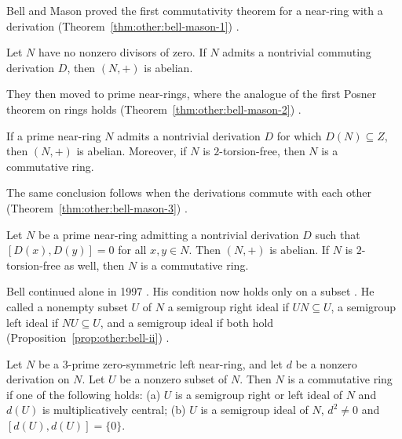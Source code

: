 Bell and Mason proved the first commutativity theorem for a near-ring with a
derivation (Theorem~\ref{thm:other:bell-mason-1}) \cite[Theorem~1,
p.~32]{BellMason1987}.

\begin{theorem}\label{thm:other:bell-mason-1}
Let $N$ have no nonzero divisors of zero. If $N$ admits a nontrivial
commuting derivation $D$, then $(N, +)$ is abelian.
\end{theorem}

They then moved to prime near-rings, where the analogue of the first Posner
theorem on rings holds (Theorem~\ref{thm:other:bell-mason-2}) \cite[Theorem~2,
p.~32]{BellMason1987}.

\begin{theorem}\label{thm:other:bell-mason-2}
If a prime near-ring $N$ admits a nontrivial derivation $D$ for which
$D(N) \subseteq Z$, then $(N, +)$ is abelian. Moreover, if $N$ is
$2$-torsion-free, then $N$ is a commutative ring.
\end{theorem}

The same conclusion follows when the derivations commute with each other (Theorem~\ref{thm:other:bell-mason-3})
\cite[Theorem~3, p.~33]{BellMason1987}.\begin{theorem}\label{thm:other:bell-mason-3}
Let $N$ be a prime near-ring admitting a nontrivial derivation $D$ such
that $[D(x), D(y)] = 0$ for all $x, y \in N$. Then $(N, +)$ is abelian.
If $N$ is $2$-torsion-free as well, then $N$ is a commutative ring.
\end{theorem}

Bell continued alone in 1997 \cite[p.~191]{Bell1997II}. His condition now
holds only on a subset \cite[p.~191]{Bell1997II}. He called a nonempty subset
$U$ of $N$ a semigroup right ideal if $U N \subseteq U$, a semigroup left
ideal if $N U \subseteq U$, and a semigroup ideal if both hold
(Proposition~\ref{prop:other:bell-ii}) \cite[p.~191]{Bell1997II}.

\begin{proposition}\label{prop:other:bell-ii}
Let $N$ be a $3$-prime zero-symmetric left near-ring, and let $d$ be a
nonzero derivation on $N$. Let $U$ be a nonzero subset of $N$. Then $N$ is
a commutative ring if one of the following holds: \textup{(a)} $U$ is a
semigroup right or left ideal of $N$ and $d(U)$ is multiplicatively
central; \textup{(b)} $U$ is a semigroup ideal of $N$, $d^{2} \neq 0$ and
$[d(U), d(U)] = \{0\}$.
\end{proposition}


